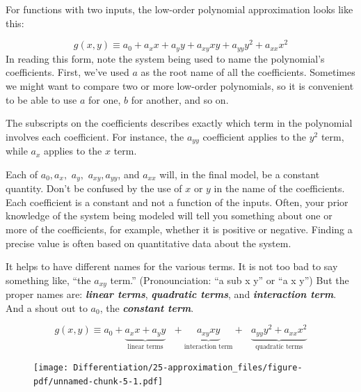 \documentclass[
  letterpaper,
  DIV=11,
  numbers=noendperiod,
  oneside]{scrreprt}
\begin{document}
For functions with two inputs, the low-order polynomial approximation
looks like this:

\[g(x, y) \equiv a_0 + a_x x + a_y y + a_{xy} x y + a_{yy} y^2 + a_{xx} x^2\]
In reading this form, note the system being used to name the
polynomial's coefficients. First, we've used \(a\) as the root name of
all the coefficients. Sometimes we might want to compare two or more
low-order polynomials, so it is convenient to be able to use \(a\) for
one, \(b\) for another, and so on.

The subscripts on the coefficients describes exactly which term in the
polynomial involves each coefficient. For instance, the \(a_{yy}\)
coefficient applies to the \(y^2\) term, while \(a_x\) applies to the
\(x\) term.

Each of \(a_0, a_x,\) \(a_y,\) \(a_{xy}, a_{yy}\), and \(a_{xx}\) will,
in the final model, be a constant quantity. Don't be confused by the use
of \(x\) or \(y\) in the name of the coefficients. Each coefficient is a
constant and not a function of the inputs. Often, your prior knowledge
of the system being modeled will tell you something about one or more of
the coefficients, for example, whether it is positive or negative.
Finding a precise value is often based on quantitative data about the
system.

It helps to have different names for the various terms. It is not too
bad to say something like, ``the \(a_{xy}\) term.'' (Pronounciation: ``a
sub x y'' or ``a x y'') But the proper names are: \textbf{\emph{linear
terms}}, \textbf{\emph{quadratic terms}}, and \textbf{\emph{interaction
term}}. And a shout out to \(a_0\), the \textbf{\emph{constant term}}.

\[g(x, y) \equiv a_0 + \underbrace{a_x x + a_y y}_\text{linear terms} \ \ \ + 
\underbrace{a_{xy} x y}_\text{interaction term} +\ \ \  \underbrace{a_{yy} y^2 + a_{xx} x^2}_\text{quadratic terms}\]

\begin{figure}

{\centering \texttt{[image: Differentiation/25-approximation\_files/figure-pdf/unnamed-chunk-5-1.pdf]}

}

\end{figure}
\end{document}
